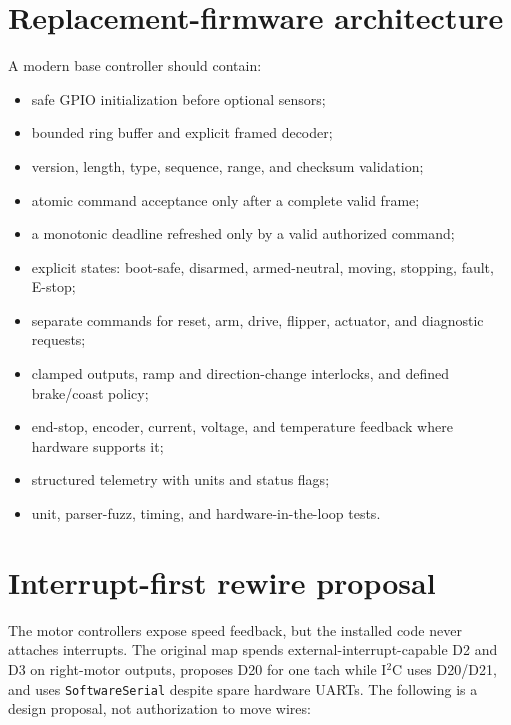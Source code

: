\documentclass[10pt,openany]{book}
\begin{document}
\section{Replacement-firmware architecture}

A modern base controller should contain:

\begin{itemize}
  \item safe GPIO initialization before optional sensors;
  \item bounded ring buffer and explicit framed decoder;
  \item version, length, type, sequence, range, and checksum validation;
  \item atomic command acceptance only after a complete valid frame;
  \item a monotonic deadline refreshed only by a valid authorized command;
  \item explicit states: boot-safe, disarmed, armed-neutral, moving, stopping, fault, E-stop;
  \item separate commands for reset, arm, drive, flipper, actuator, and diagnostic requests;
  \item clamped outputs, ramp and direction-change interlocks, and defined brake/coast policy;
  \item end-stop, encoder, current, voltage, and temperature feedback where hardware supports it;
  \item structured telemetry with units and status flags;
  \item unit, parser-fuzz, timing, and hardware-in-the-loop tests.
\end{itemize}

\section{Interrupt-first rewire proposal}

The motor controllers expose speed feedback, but the installed code never attaches interrupts. The original map spends external-interrupt-capable D2 and D3 on right-motor outputs, proposes D20 for one tach while I$^2$C uses D20/D21, and uses \texttt{SoftwareSerial} despite spare hardware UARTs. The following is a design proposal, not authorization to move wires:
\end{document}
